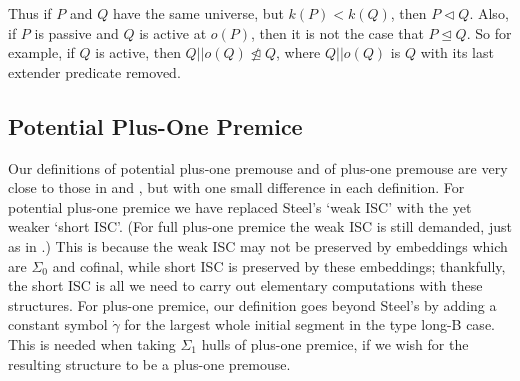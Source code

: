\documentclass[12pt]{article}
\begin{document}
Thus if $P$ and $Q$ have the same universe, but $k (P) < k (Q)$, then $P \lhd Q$.  Also, if $P$ is passive and $Q$ is active at $o(P)$, then it is not the case that $P \unlhd Q$.  So for example, if $Q$ is active, then $Q || o(Q) \ntrianglelefteq Q$, where $Q || o(Q)$ is $Q$ with its last extender predicate removed.\\





\subsection{Potential Plus-One Premice}

Our definitions of potential plus-one premouse and of plus-one premouse are very close to those in \cite{PIPM} and \cite{FSPIPM}, but with one small difference in each definition.  For potential plus-one premice we have replaced Steel's `weak ISC' with the yet weaker `short ISC'.  (For full plus-one premice the weak ISC is still demanded, just as in \cite{PIPM}.)  This is because the weak ISC may not be preserved by embeddings which are $\Sigma_0$ and cofinal, while short ISC is preserved by these embeddings; thankfully, the short ISC is all we need to carry out elementary computations with these structures.  For plus-one premice, our definition goes beyond Steel's by adding a constant symbol $\dot{\gamma}$ for the largest whole initial segment in the type long-B case.  This is needed when taking $\Sigma_1$ hulls of plus-one premice, if we wish for the resulting structure to be a plus-one premouse.\\
\end{document}
